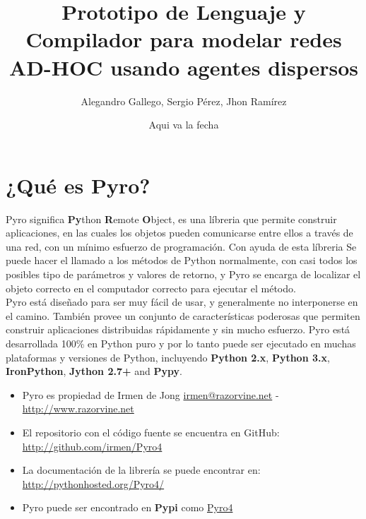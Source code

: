 \documentclass{article}
\begin{document}
\title{Prototipo de Lenguaje y Compilador para modelar redes AD-HOC usando agentes dispersos}
\author{Alegandro Gallego, Sergio Pérez, Jhon Ramírez}
\date{Aqui va la fecha}
\maketitle

\section{¿Qué es Pyro?}
Pyro significa \textbf{Py}thon \textbf{R}emote \textbf{O}bject, es una líbreria que permite construir aplicaciones, en las cuales los objetos pueden comunicarse entre ellos a través de una red, con un mínimo esfuerzo de programación. Con ayuda de esta líbreria Se puede hacer el llamado a los métodos de Python normalmente, con casi todos los posibles tipo de parámetros y valores de retorno, y Pyro se encarga de localizar el objeto correcto en el computador correcto para ejecutar el método.\\

Pyro está diseñado para ser muy fácil de usar, y generalmente no interponerse en el camino. También provee un conjunto de características poderosas que permiten construir aplicaciones distribuidas rápidamente y sin mucho esfuerzo. Pyro está desarrollada 100\% en Python puro y por lo tanto puede ser ejecutado en muchas plataformas y versiones de Python, incluyendo \textbf{Python 2.x}, \textbf{Python 3.x}, \textbf{IronPython}, \textbf{Jython 2.7+} and \textbf{Pypy}.\\

\begin{itemize}
\item Pyro es propiedad de Irmen de Jong \href{mailto:irmen@razorvine.net}{irmen@razorvine.net} - \url{http://www.razorvine.net}
\item El repositorio con el código fuente se encuentra en GitHub: \url{http://github.com/irmen/Pyro4}
\item La documentación de la librería se puede encontrar en: \url{http://pythonhosted.org/Pyro4/}
\item Pyro puede ser encontrado en \textbf{Pypi} como \href{https://pypi.python.org/pypi/Pyro4/}{Pyro4}
\end{itemize}
\end{document}
